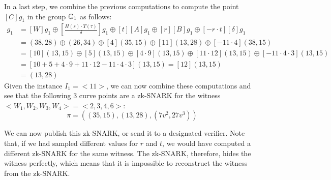 \begin{example}
In a last step, we combine the previous computations to compute the point $[C]g_1$ in the group $\mathbb{G}_1$ as follows:
\begin{align*}
[C]g_1 & = [W]g_1\oplus [\frac{H(s)\cdot T(\tau)}{\delta}]g_1 \oplus [t][A]g_1 \oplus [r][B]g_1 \oplus [-r\cdot t][\delta]g_1\\
       & = (38,28)\oplus (26,34) \oplus [4](35,15) \oplus [11](13,28) \oplus [-11\cdot 4](38,15)\\       
       & = [10](13,15)\oplus [5](13,15) \oplus [4\cdot 9](13,15) \oplus [11\cdot 12](13,15) \oplus [-11\cdot 4\cdot 3](13,15)\\    
       & = [10+5+4\cdot 9+11\cdot 12-11\cdot 4\cdot 3](13,15)=[12](13,15)\\
       & = (13,28)
\end{align*}
Given the instance $I_1=<11>$, we can now combine these computations and see that the following $3$ curve points are a zk-SNARK for the witness $<W_1,W_2,W_3,W_4>=<2,3,4,6>$:
\begin{equation}
\label{ex:3-fac-groth-16-snark}
\pi=((35,15),(13,28),(7v^2,27v^3))
\end{equation}

We can now publish this zk-SNARK, or send it to a designated verifier. Note that, if we had sampled different values for $r$ and $t$, we would have computed a different zk-SNARK for the same witness. The zk-SNARK, therefore, hides the witness perfectly, which means that it is impossible to reconstruct the witness from the zk-SNARK.
\end{example}
